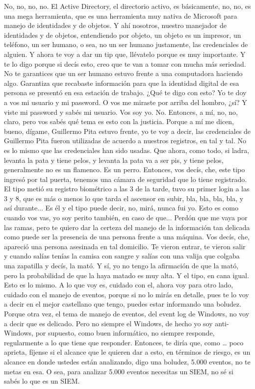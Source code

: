 \begin{description}[leftmargin=0cm, labelsep=0.5cm]
    \item[\textbf{PITA GUILLERMO:}] No, no, no, no. El Active Directory, el directorio activo, es básicamente, no, no, es una mega herramienta, que es una herramienta muy nativa de Microsoft para manejo de identidades y de objetos. Y ahí nosotros, nuestro manejador de identidades y de objetos, entendiendo por objeto, un objeto es un impresor, un teléfono, un ser humano, o sea, no un ser humano justamente, las credenciales de alguien. Y ahora te voy a dar un tip que, llévatelo porque es muy importante. Y te lo digo porque si decís esto, creo que te van a tomar con mucha más seriedad. No te garantices que un ser humano estuvo frente a una computadora haciendo algo. Garantiza que recabaste información para que la identidad digital de esa persona se presentó en esa estación de trabajo. ¿Qué te digo con esto? Yo te doy a vos mi usuario y mi password. O vos me miraste por arriba del hombro, ¿sí? Y viste mi password y sabés mi usuario. Vos soy yo. No. Entonces, a mí, no, no, claro, pero vos sabés qué tema es esto con la justicia. Porque a mí me dicen, bueno, dígame, Guillermo Pita estuvo frente, yo te voy a decir, las credenciales de Guillermo Pita fueron utilizadas de acuerdo a nuestros registros, en tal y tal. No es lo mismo que las credenciales han sido usadas. Que ahora, como todo, si ladra, levanta la pata y tiene pelos, y levanta la pata va a ser pis, y tiene pelos, generalmente no es un flamenco. Es un perro. Entonces, vos decís, che, este tipo ingresó por tal puerta, tenemos una cámara de seguridad que lo tiene registrado. El tipo metió su registro biométrico a las 3 de la tarde, tuvo su primer login a las 3 y 8, que es más o menos lo que tarda el ascensor en subir, bla, bla, bla, bla, y así durante... Es él y el tipo puede decir, no, mirá, nunca fui yo. Esto es como cuando vos vas, yo soy perito también, en caso de que... Perdón que me vaya por las ramas, pero te quiero dar la certeza del manejo de la información tan delicada como puede ser la presencia de una persona frente a una máquina. Vos decís, che, apareció una persona asesinada en tal domicilio. Te vieron entrar, te vieron salir y cuando salías tenías la camisa con sangre y salías con una valija que colgaba una zapatilla y decís, la mató. Y sí, yo no tengo la afirmación de que la mató, pero la probabilidad de que la haya matado es muy alta. Y el tipo, en cana igual. Esto es lo mismo. A lo que voy es, cuidado con el, ahora voy para otro lado, cuidado con el manejo de eventos, porque si no lo mirás en detalle, pues te lo voy a decir en el mejor castellano que tengo, puedes estar informando una boludez. Porque otra vez, el tema de manejo de eventos, del event log de Windows, no voy a decir que es delicado. Pero no siempre el Windows, de hecho yo soy anti-Windows, por supuesto, como buen informático, no siempre responde, regularmente a lo que tiene que responder. Entonces, te diría que, como … poco aprieta, fíjense si el alcance que le quieren dar a esto, en términos de riesgo, es un alcance en donde ustedes están analizando, digo una boludez, 5.000 eventos, no te metas en esa. O sea, para analizar 5.000 eventos necesitas un SIEM, no sé si sabés lo que es un SIEM.


\end{description}
